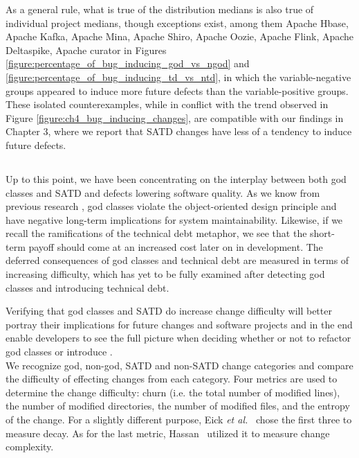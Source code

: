 As a general rule, what is true of the distribution medians is also true of individual project medians, though exceptions exist, among them Apache Hbase, Apache Kafka, Apache Mina, Apache Shiro, Apache Oozie, Apache Flink, Apache Deltaspike, Apache curator in Figures \ref{figure:percentage_of_bug_inducing_god_vs_ngod} and \ref{figure:percentage_of_bug_inducing_td_vs_ntd}, in which the variable-negative groups appeared to induce more future defects than the variable-positive groups. These isolated counterexamples, while in conflict with the trend observed in Figure \ref{figure:ch4_bug_inducing_changes}, are compatible with our findings in Chapter 3, where we report that SATD changes have less of a tendency to induce future defects.

\subsection*{\chapterIVrqIII}

Up to this point, we have been concentrating on the interplay between both god classes and SATD and defects lowering software quality. As we know from previous research \cite{marinescu2004detection}, god classes violate the object-oriented design principle and have negative long-term implications for system maintainability. Likewise, if we recall the ramifications of the technical debt metaphor, we see that the short-term payoff should come at an increased cost later on in development. The deferred consequences of god classes and technical debt are measured in terms of increasing difficulty, which has yet to be fully examined after detecting god classes and introducing technical debt.


Verifying that god classes and SATD do increase change difficulty will better portray their implications for future changes and software projects and in the end enable developers to see the full picture when deciding whether or not to refactor god classes or introduce \SATD. \\

We recognize god, non-god, SATD and non-SATD change categories and compare the difficulty of effecting changes from each category. Four metrics are used to determine the change difficulty: churn (i.e. the total number of modified lines), the number of modified directories, the number of modified files, and the entropy of the change. For a slightly different purpose, Eick \emph{et al.}~\cite{eick2001decay} chose the first three to measure decay. As for the last metric, Hassan~\cite{hassan2009predicting} utilized it to measure change complexity.



